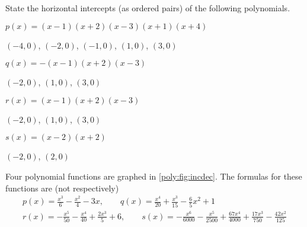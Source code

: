 \begin{exercises}
\begin{figure}[!htb]
\begin{widepage}
\end{widepage}
\end{figure}
\begin{problem}\label{poly:prob:matchpolys}%
State the horizontal intercepts (as ordered pairs) of the following polynomials.
\begin{multicols}{2}
    \begin{subproblem}\label{poly:prob:degree5}
        $p(x)=(x-1)(x+2)(x-3)(x+1)(x+4)$
        \begin{shortsolution}
            $(-4,0)$, $(-2,0)$, $(-1,0)$, $(1,0)$, $(3,0)$
        \end{shortsolution}
    \end{subproblem}
    \begin{subproblem}
        $q(x)=-(x-1)(x+2)(x-3)$
        \begin{shortsolution}
            $(-2,0)$, $(1,0)$, $(3,0)$
        \end{shortsolution}
    \end{subproblem}
    \begin{subproblem}
        $r(x)=(x-1)(x+2)(x-3)$
        \begin{shortsolution}
            $(-2,0)$, $(1,0)$, $(3,0)$
        \end{shortsolution}
    \end{subproblem}
    \begin{subproblem}\label{poly:prob:degree2}
        $s(x)=(x-2)(x+2)$
        \begin{shortsolution}
            $(-2,0)$, $(2,0)$
        \end{shortsolution}
    \end{subproblem}
\end{multicols}
\end{problem}
\begin{problem}\label{poly:prob:incdec}
 Four polynomial functions are graphed in \cref{poly:fig:incdec}. The formulas
 for these functions are (not respectively)
\begin{gather*}
 p(x)=\frac{x^3}{6}-\frac{x^2}{4}-3x, \qquad q(x)=\frac{x^4}{20}+\frac{x^3}{15}-\frac{6}{5}x^2+1\\
 r(x)=-\frac{x^5}{50}-\frac{x^4}{40}+\frac{2x^3}{5}+6, \qquad s(x)=-\frac{x^6}{6000}-\frac{x^5}{2500}+\frac{67x^4}{4000}+\frac{17x^3}{750}-\frac{42x^2}{125}

\end{gather*}
\end{problem}
\end{exercises}
